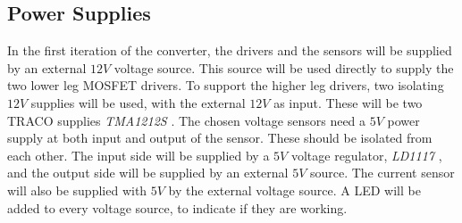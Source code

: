 \subsection{Power Supplies}\label{power_supplies}
In the first iteration of the converter, the drivers and the sensors will be supplied by an external $12V$ voltage source. This source will be used directly to supply the two lower leg MOSFET drivers. To support the higher leg drivers, two isolating $12V$ supplies will be used, with the external $12V$ as input. These will be two TRACO supplies \textit{TMA1212S} \cite{traco_tma1212}. The chosen voltage sensors need a $5V$ power supply at both input and output of the sensor. These should be isolated from each other. The input side will be supplied by a $5V$ voltage regulator, \textit{LD1117} \cite{LD1117}, and the output side will be supplied by an external $5V$ source. The current sensor will also be supplied with $5V$ by the external voltage source. A LED will be added to every voltage source, to indicate if they are working.